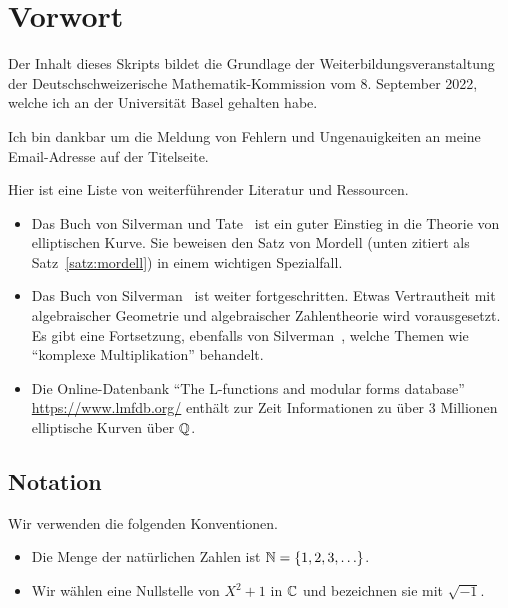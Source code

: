 \chapter{Vorwort}

Der Inhalt dieses Skripts bildet die Grundlage der
Weiterbildungsveranstaltung der Deutschschweizerische
Mathematik-Kommission vom 8. September 2022, welche ich an der
Universität Basel gehalten habe.

Ich bin dankbar um die Meldung von Fehlern und Ungenauigkeiten an
meine Email-Adresse auf der Titelseite.

Hier ist eine Liste von weiterführender Literatur und Ressourcen.
\begin{itemize}
\item Das Buch von Silverman und Tate~\cite{SilvermanTate}
  ist ein guter Einstieg in die Theorie von
  elliptischen Kurve.  Sie beweisen den Satz von Mordell (unten zitiert
  als Satz~\ref{satz:mordell}) in einem wichtigen Spezialfall.
\item Das Buch von Silverman~\cite{Silverman:AEC} ist weiter
  fortgeschritten. Etwas Vertrautheit mit  algebraischer Geometrie
  und  algebraischer Zahlentheorie wird vorausgesetzt. Es gibt eine
  Fortsetzung, ebenfalls von Silverman~\cite{Silverman:Adv}, welche
  Themen wie ``komplexe Multiplikation'' behandelt.
\item Die Online-Datenbank ``The L-functions and modular forms
  database'' \url{https://www.lmfdb.org/} enthält zur Zeit
  Informationen zu über 3
  Millionen elliptische Kurven über ${\mathbb{Q}}$.
\end{itemize}

\section{Notation}

Wir verwenden die folgenden Konventionen.

\begin{itemize}
\item Die Menge der natürlichen Zahlen ist ${\mathbb{N}} = \{1,2,3,\ldots\}$.

\item Wir wählen eine Nullstelle von $X^2+1$ in ${\mathbb{C}}$ und bezeichnen sie
  mit $\sqrt{-1}$.
  
\end{itemize}

